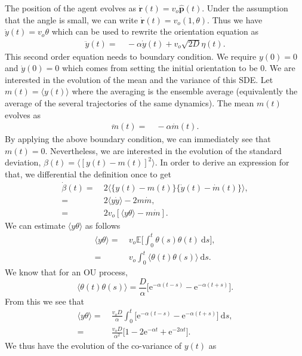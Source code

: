 \documentclass[12pt]{article}
\def\d{\text{d}}
\def\e{\text{e}}
\def\r{\mathbf{r}}
\def\E{\mathbb{E}}
\def\ph{\hat{\mathbf{p}}}
\def\yd{\dot{y}}
\begin{document}
The position of the agent evolves as $\dot{\r}(t) = v_o \ph(t)$. Under the assumption that the angle
is small, we can write $\dot{\r}(t) = v_o (1, \theta)$. Thus we have $\yd (t) = v_o \theta$ which can
be used to rewrite the orientation equation as
\begin{align}
    \ddot{y}(t) =& \ - \alpha \yd (t) + v_o\sqrt{2 D} \eta(t).
\end{align}
This second order equation needs to boundary condition. We require $y(0) = 0$ and $\yd (0) = 0$ which
comes from setting the initial orientation to be 0. We are interested in the evolution of the mean and the variance of this SDE. Let $m(t)= \langle y(t) \rangle$
where the averaging is the ensemble average (equivalently the average of the several trajectories of the
same dynamics). The mean $m(t)$ evolves as
\begin{align}
    \ddot{m}(t) =& \ -\alpha \dot{m}(t).
\end{align}
By applying the above boundary condition, we can immediately see that $m(t) = 0$. Nevertheless, we are
interested in the evolution of the standard deviation, $\beta(t) = \langle [y(t) - m(t)]^2 \rangle$.
In order to derive an expression for that, we differential the definition once to get
\begin{align*}
    \dot{\beta}(t) =& \ 2 \langle \{ y(t) - m(t) \} \{ \yd(t) - \dot{m}(t) \} \rangle, \\
    = & \ 2 \langle y \yd \rangle - 2 m \dot{m}, \\
    = & \ 2 v_o [ \langle y \theta \rangle - m \dot{m}].
\end{align*}
We can estimate $\langle y \theta \rangle$ as follows
\begin{align*}
    \langle y \theta \rangle =& \ v_o \E \bigg[ \int_0^t \theta(s) \theta(t) \ \d s \bigg], \\
    =& \ v_o  \int_0^t \langle\theta(t) \theta(s)\rangle \ \d s.
\end{align*}
We know that for an OU process, 
\[
\langle\theta(t) \theta(s)\rangle = \frac{D}{\alpha} \bigg[ \e^{-\alpha(t-s)}-\e^{-\alpha(t+s)} \bigg].
\]
From this we see that
\begin{align*}
    \langle y \theta \rangle =& \ \frac{v_o D}{\alpha} \int_0^t  \bigg[ \e^{-\alpha(t-s)}-\e^{-\alpha(t+s)} \bigg] \ \d s, \\
    =& \ \frac{v_o D}{\alpha^2} \bigg[ 1 - 2 \e^{-\alpha t} + \e^{-2 \alpha t}\bigg].
\end{align*}
We thus have the evolution of the co-variance of $y(t)$ as
\end{document}
